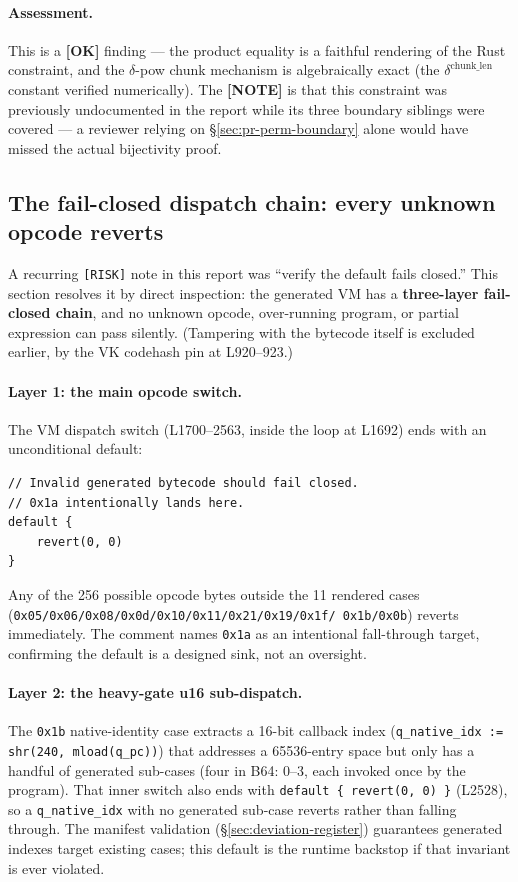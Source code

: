 \paragraph{Assessment.} This is a
\textcolor{tracegreen}{\textbf{[OK]}} finding --- the product
equality is a faithful rendering of the Rust constraint, and the
$\delta$-pow chunk mechanism is algebraically exact (the
$\delta^{\text{chunk\_len}}$ constant verified numerically). The
\textcolor{mathpurple}{\textbf{[NOTE]}} is that this constraint
was previously undocumented in the report while its three
boundary siblings were covered --- a reviewer relying on
§\ref{sec:pr-perm-boundary} alone would have missed the actual
bijectivity proof.

\subsection{The fail-closed dispatch chain: every unknown opcode reverts}
\label{sec:pr-failclosed}

A recurring \texttt{[RISK]} note in this report was ``verify the
default fails closed.'' This section resolves it by direct
inspection: the generated VM has a \textbf{three-layer fail-closed
chain}, and no unknown opcode, over-running program, or partial
expression can pass silently. (Tampering with the bytecode itself
is excluded earlier, by the VK codehash pin at L920--923.)

\paragraph{Layer 1: the main opcode switch.} The VM dispatch
switch (L1700--2563, inside the loop at L1692) ends with an
unconditional default:
\begin{lstlisting}[style=yul]
// Invalid generated bytecode should fail closed.
// 0x1a intentionally lands here.
default {
    revert(0, 0)
}
\end{lstlisting}
Any of the 256 possible opcode bytes outside the 11 rendered
cases (\texttt{0x05/\allowbreak{}0x06/\allowbreak{}0x08/\allowbreak{}0x0d/\allowbreak{}0x10/\allowbreak{}0x11/\allowbreak{}0x21/\allowbreak{}0x19/\allowbreak{}0x1f/\allowbreak{}
0x1b/\allowbreak{}0x0b}) reverts immediately. The comment names
\texttt{0x1a} as an intentional fall-through target, confirming
the default is a designed sink, not an oversight.

\paragraph{Layer 2: the heavy-gate u16 sub-dispatch.} The
\texttt{0x1b} native-identity case extracts a 16-bit callback
index (\texttt{q\_\allowbreak{}native\_\allowbreak{}idx := shr(240, mload(q\_\allowbreak{}pc))}) that
addresses a 65536-entry space but only has a handful of generated
sub-cases (four in B64: 0--3, each invoked once by the program). That inner switch also ends with
\texttt{default \{ revert(0, 0) \}} (L2528), so a
\texttt{q\_native\_idx} with no generated sub-case reverts rather
than falling through. The manifest validation
(§\ref{sec:deviation-register}) guarantees generated indexes
target existing cases; this default is the runtime backstop if
that invariant is ever violated.

